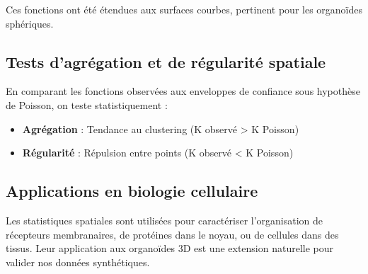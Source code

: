 Ces fonctions ont été étendues aux surfaces courbes, pertinent pour les organoïdes sphériques.

\subsection{Tests d'agrégation et de régularité spatiale}

En comparant les fonctions observées aux enveloppes de confiance sous hypothèse de Poisson, on teste statistiquement :
\begin{itemize}
    \item \textbf{Agrégation} : Tendance au clustering (K observé > K Poisson)
    \item \textbf{Régularité} : Répulsion entre points (K observé < K Poisson)
\end{itemize}

\subsection{Applications en biologie cellulaire}

Les statistiques spatiales sont utilisées pour caractériser l'organisation de récepteurs membranaires, de protéines dans le noyau, ou de cellules dans des tissus. Leur application aux organoïdes 3D est une extension naturelle pour valider nos données synthétiques.

